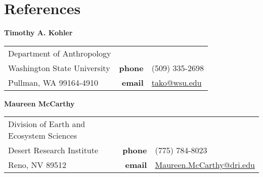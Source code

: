 \section{References}

{\bf Timothy A. Kohler}
\begin{list1}
\item[]
\begin{tabular}{@{}p{2.75in}rl}

Department of Anthropology   &  &  \\            
Washington State University  & {\bf phone} & (509) 335-2698 \\         
Pullman, WA  99164-4910      & {\bf email} & \href{mailto: tako@wsu.edu}{tako@wsu.edu}\\
    
\end{tabular}
\end{list1}

\vspace{0.1in}

%
%    
%

{\bf Maureen McCarthy}
\begin{list1}
\item[]
\begin{tabular}{@{}p{2.75in}rl}
Division of Earth and Ecosystem Sciences & & \\
Desert Research Institute & {\bf phone} & (775) 784-8023 \\         
Reno, NV  89512      & {\bf email} & \href{mailto: Maureen.McCarthy@dri.edu}{Maureen.McCarthy@dri.edu}\\
    
\end{tabular}
\end{list1}

